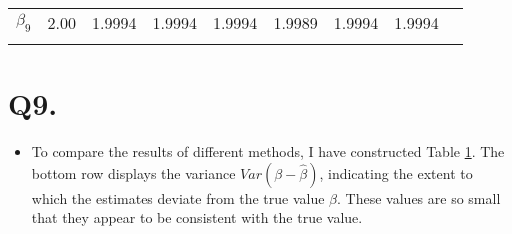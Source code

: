 \documentclass{article}
\begin{document}
\begin{table}[!h]
\begin{tabular}[t]{ccccccccc}
		$\beta_{9}$ & 2.00 & 1.9994 & 1.9994 & 1.9994 & 1.9989 & 1.9994 & 1.9994\\
		\addlinespace\cellcolor{gray!10}{$Var(\beta - \widehat{\beta})$(e-5)} & \cellcolor{gray!10}{0.00} & \cellcolor{gray!10}{0.43953} & \cellcolor{gray!10}{0.43954} & \cellcolor{gray!10}{0.43953} & \cellcolor{gray!10}{0.44349} & \cellcolor{gray!10}{0.43953} & \cellcolor{gray!10}{0.43953}\\
		\bottomrule
	\end{tabular}
	\label{t2:table2}
\end{table}
	
\section*{Q9.}
\begin{itemize}
	\item To compare the results of different methods, I have constructed Table \ref{t2:table2}. The bottom row displays the variance $ Var\left(\beta - \widehat{\beta}\right) $, indicating the extent to which the estimates deviate from the true value $ \beta $. These values are so small that they appear to be consistent with the true value.
\end{itemize}
\end{document}
